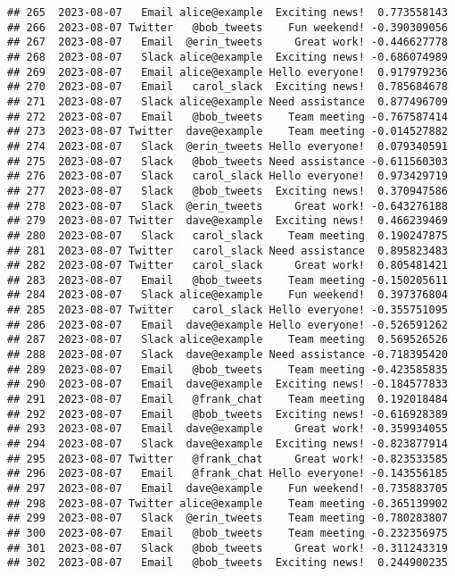 \documentclass[
]{article}
\begin{document}
\begin{verbatim}
## 265  2023-08-07   Email alice@example  Exciting news!  0.773558143
## 266  2023-08-07 Twitter   @bob_tweets    Fun weekend! -0.390309056
## 267  2023-08-07   Email  @erin_tweets     Great work! -0.446627778
## 268  2023-08-07   Slack alice@example  Exciting news! -0.686074989
## 269  2023-08-07   Email alice@example Hello everyone!  0.917979236
## 270  2023-08-07   Email   carol_slack  Exciting news!  0.785684678
## 271  2023-08-07   Slack alice@example Need assistance  0.877496709
## 272  2023-08-07   Email   @bob_tweets    Team meeting -0.767587414
## 273  2023-08-07 Twitter  dave@example    Team meeting -0.014527882
## 274  2023-08-07   Slack  @erin_tweets Hello everyone!  0.079340591
## 275  2023-08-07   Slack   @bob_tweets Need assistance -0.611560303
## 276  2023-08-07   Slack   carol_slack Hello everyone!  0.973429719
## 277  2023-08-07   Slack   @bob_tweets  Exciting news!  0.370947586
## 278  2023-08-07   Slack  @erin_tweets     Great work! -0.643276188
## 279  2023-08-07 Twitter  dave@example  Exciting news!  0.466239469
## 280  2023-08-07   Slack   carol_slack    Team meeting  0.190247875
## 281  2023-08-07 Twitter   carol_slack Need assistance  0.895823483
## 282  2023-08-07 Twitter   carol_slack     Great work!  0.805481421
## 283  2023-08-07   Email   @bob_tweets    Team meeting -0.150205611
## 284  2023-08-07   Slack alice@example    Fun weekend!  0.397376804
## 285  2023-08-07 Twitter   carol_slack Hello everyone! -0.355751095
## 286  2023-08-07   Email  dave@example Hello everyone! -0.526591262
## 287  2023-08-07   Slack alice@example    Team meeting  0.569526526
## 288  2023-08-07   Slack  dave@example Need assistance -0.718395420
## 289  2023-08-07   Email   @bob_tweets    Team meeting -0.423585835
## 290  2023-08-07   Email  dave@example  Exciting news! -0.184577833
## 291  2023-08-07   Email   @frank_chat    Team meeting  0.192018484
## 292  2023-08-07   Email   @bob_tweets  Exciting news! -0.616928389
## 293  2023-08-07   Email  dave@example     Great work! -0.359934055
## 294  2023-08-07   Slack  dave@example  Exciting news! -0.823877914
## 295  2023-08-07 Twitter   @frank_chat     Great work! -0.823533585
## 296  2023-08-07   Email   @frank_chat Hello everyone! -0.143556185
## 297  2023-08-07   Email  dave@example    Fun weekend! -0.735883705
## 298  2023-08-07 Twitter alice@example    Team meeting -0.365139902
## 299  2023-08-07   Slack  @erin_tweets    Team meeting -0.780283807
## 300  2023-08-07   Email   @bob_tweets    Team meeting -0.232356975
## 301  2023-08-07   Slack   @bob_tweets     Great work! -0.311243319
## 302  2023-08-07   Email   @bob_tweets  Exciting news!  0.244900235

\end{verbatim}
\end{document}
